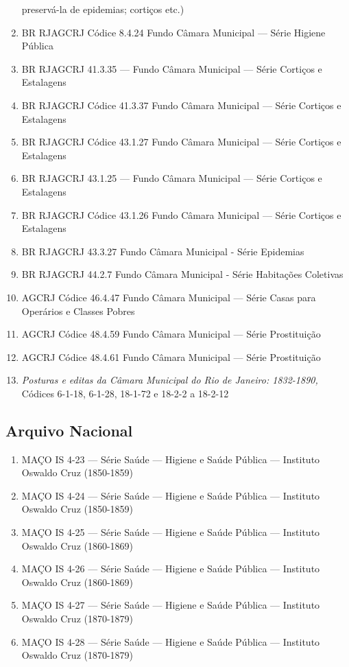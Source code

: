 \begin{enumerate}
  preservá-la de epidemias; cortiços etc.)
\item
  BR RJAGCRJ Códice 8.4.24 Fundo Câmara Municipal --- Série Higiene
  Pública
\item
  BR RJAGCRJ 41.3.35 --- Fundo Câmara Municipal --- Série Cortiços e
  Estalagens
\item
  BR RJAGCRJ Códice 41.3.37 Fundo Câmara Municipal --- Série Cortiços e
  Estalagens
\item
  BR RJAGCRJ Códice 43.1.27 Fundo Câmara Municipal --- Série Cortiços e
  Estalagens
\item
  BR RJAGCRJ 43.1.25 --- Fundo Câmara Municipal --- Série Cortiços e
  Estalagens
\item
  BR RJAGCRJ Códice 43.1.26 Fundo Câmara Municipal --- Série Cortiços e
  Estalagens
\item
  BR RJAGCRJ 43.3.27 Fundo Câmara Municipal - Série Epidemias
\item
  BR RJAGCRJ 44.2.7 Fundo Câmara Municipal - Série Habitações Coletivas
\item
  AGCRJ Códice 46.4.47 Fundo Câmara Municipal --- Série Casas para
  Operários e Classes Pobres
\item
  AGCRJ Códice 48.4.59 Fundo Câmara Municipal --- Série Prostituição
\item
  AGCRJ Códice 48.4.61 Fundo Câmara Municipal --- Série Prostituição
\item
  \textit{Posturas e editas da Câmara Municipal do Rio de Janeiro:
  1832-1890,} Códices 6-1-18, 6-1-28, 18-1-72 e 18-2-2 a 18-2-12
\end{enumerate}

\subsection*{Arquivo Nacional}\label{arquivo-nacional}

\begin{enumerate}
\def\labelenumi{\arabic{enumi}.}
\item
  MAÇO IS 4-23 --- Série Saúde --- Higiene e Saúde Pública --- Instituto
  Oswaldo Cruz (1850-1859)
\item
  MAÇO IS 4-24 --- Série Saúde --- Higiene e Saúde Pública --- Instituto
  Oswaldo Cruz (1850-1859)
\item
  MAÇO IS 4-25 --- Série Saúde --- Higiene e Saúde Pública --- Instituto
  Oswaldo Cruz (1860-1869)
\item
  MAÇO IS 4-26 --- Série Saúde --- Higiene e Saúde Pública --- Instituto
  Oswaldo Cruz (1860-1869)
\item
  MAÇO IS 4-27 --- Série Saúde --- Higiene e Saúde Pública --- Instituto
  Oswaldo Cruz (1870-1879)
\item
  MAÇO IS 4-28 --- Série Saúde --- Higiene e Saúde Pública --- Instituto
  Oswaldo Cruz (1870-1879)
\end{enumerate}

